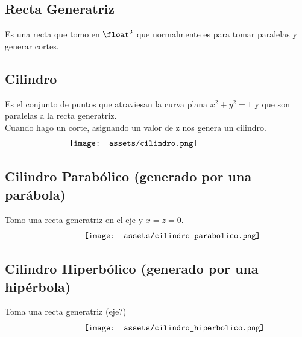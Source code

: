 \documentclass[10pt,a4paper]{article}
\begin{document}
\subsection*{Recta Generatriz}
Es una recta que tomo en $\float^{3}$ que normalmente es para tomar paralelas y generar cortes.
\subsection*{Cilindro}
Es el conjunto de puntos que atraviesan la curva plana $x^{2} + y^{2} = 1$ y que son paralelas a la recta generatriz. \\
Cuando hago un corte, asignando un valor de z nos genera un cilindro.
\[\begin{minipage}[b]{0.6\textwidth}
    \texttt{[image: assets/cilindro.png]}
\end{minipage}\]
\subsection*{Cilindro Parabólico (generado por una parábola)}
Tomo una recta generatriz en el eje y $x=z=0$.
\[\begin{minipage}[b]{0.5\textwidth}
    \texttt{[image: assets/cilindro\_parabolico.png]}
\end{minipage}\]
\subsection*{Cilindro Hiperbólico (generado por una hipérbola)}
Toma una recta generatriz (eje?)
\[\begin{minipage}[b]{0.5\textwidth}
    \texttt{[image: assets/cilindro\_hiperbolico.png]}
\end{minipage}\]
\end{document}
